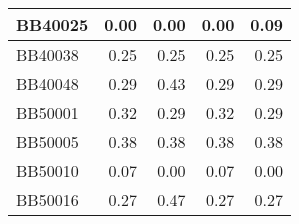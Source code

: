 \begin{table}[!htbp]
\begin{tabular}{|l|r|r|r|r|}
		\hline
		BB40025 & \cellcolor[rgb]{ .384,  .745,  .478}0.00 & \cellcolor[rgb]{ .384,  .745,  .478}0.00 & \cellcolor[rgb]{ .384,  .745,  .478}0.00 & \cellcolor[rgb]{ .988,  1,  .992}0.09 \\
		\hline
		BB40038 & \cellcolor[rgb]{ .988,  1,  .992}0.25 & \cellcolor[rgb]{ .988,  1,  .992}0.25 & \cellcolor[rgb]{ .988,  1,  .992}0.25 & \cellcolor[rgb]{ .988,  1,  .992}0.25 \\
		\hline
		BB40048 & \cellcolor[rgb]{ .384,  .745,  .478}0.29 & \cellcolor[rgb]{ .988,  1,  .992}0.43 & \cellcolor[rgb]{ .384,  .745,  .478}0.29 & \cellcolor[rgb]{ .384,  .745,  .478}0.29 \\
		\hline
		BB50001 & \cellcolor[rgb]{ .988,  1,  .992}0.32 & \cellcolor[rgb]{ .384,  .745,  .478}0.29 & \cellcolor[rgb]{ .988,  1,  .992}0.32 & \cellcolor[rgb]{ .384,  .745,  .478}0.29 \\
		\hline
		BB50005 & \cellcolor[rgb]{ .988,  1,  .992}0.38 & \cellcolor[rgb]{ .988,  1,  .992}0.38 & \cellcolor[rgb]{ .988,  1,  .992}0.38 & \cellcolor[rgb]{ .988,  1,  .992}0.38 \\
		\hline
		BB50010 & \cellcolor[rgb]{ .988,  1,  .992}0.07 & \cellcolor[rgb]{ .384,  .745,  .478}0.00 & \cellcolor[rgb]{ .988,  1,  .992}0.07 & \cellcolor[rgb]{ .384,  .745,  .478}0.00 \\
		\hline
		BB50016 & \cellcolor[rgb]{ .384,  .745,  .478}0.27 & \cellcolor[rgb]{ .988,  1,  .992}0.47 & \cellcolor[rgb]{ .384,  .745,  .478}0.27 & \cellcolor[rgb]{ .384,  .745,  .478}0.27 \\
		\hline		
	\end{tabular}%
	\label{tab:pasta-variants-a}%
\end{table}%



